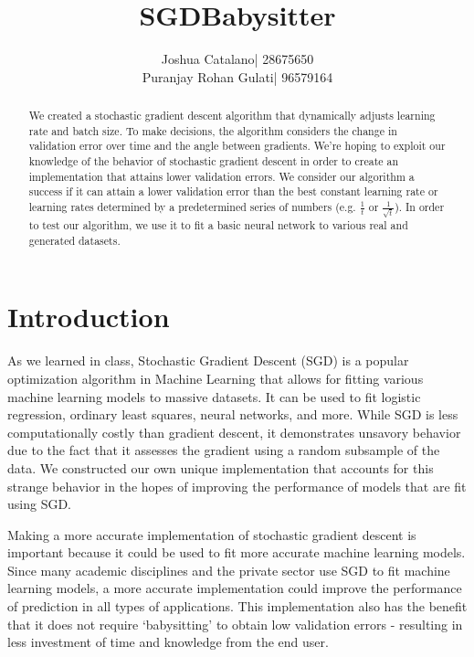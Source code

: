 \documentclass{article}
\title{SGDBabysitter}
\author{
	\begin{tabular}{rl}
			Joshua Catalano &|  28675650 \\
		Puranjay Rohan Gulati &|  96579164
	\end{tabular}
}
\begin{document}
 
 \maketitle 
 
 \begin{abstract} 
 	We created a stochastic gradient descent algorithm that dynamically adjusts learning rate and batch size. To make decisions, the algorithm considers the change in validation error over time and the angle between gradients. We're hoping to exploit our knowledge of the behavior of stochastic gradient descent in order to create an implementation that attains lower validation errors. We consider our algorithm a success if it can attain a lower validation error than the best constant learning rate or learning rates determined by a predetermined series of numbers (e.g. $\frac{1}{t}$ or $\frac{1}{\sqrt{t}}$). In order to test our algorithm, we use it to fit a basic neural network to various real and generated datasets. 
\end{abstract} 

\section{Introduction}  
As we learned in class, Stochastic Gradient Descent (SGD) is a popular optimization algorithm in Machine Learning that allows for fitting various machine learning models to massive datasets. It can be used to fit logistic regression, ordinary least squares, neural networks, and more. While SGD is less computationally costly than gradient descent, it demonstrates unsavory behavior due to the fact that it assesses the gradient using a random subsample of the data. We constructed our own unique implementation that accounts for this strange behavior in the hopes of improving the performance of models that are fit using SGD. 
\par Making a more accurate implementation of stochastic gradient descent is important because it could be used to fit more accurate machine learning models. Since many academic disciplines and the private sector use SGD to fit machine learning models, a more accurate implementation could improve the performance of prediction in all types of applications. This implementation also has the benefit that it does not require `babysitting' to obtain low validation errors - resulting in less investment of time and knowledge from the end user. 
\end{document}
